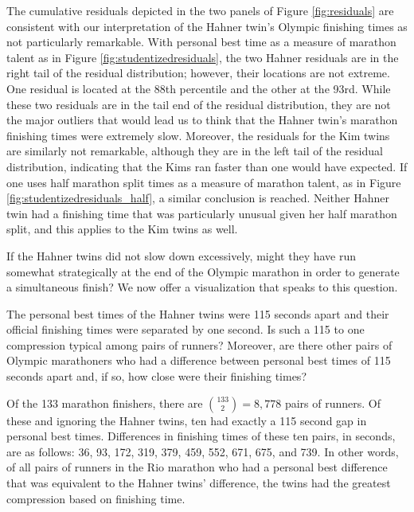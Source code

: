 \documentclass[12pt,titlepage]{article}
\begin{document}
The cumulative residuals depicted in the two panels of Figure
\ref{fig:residuals} are consistent with our interpretation of the
Hahner twin's Olympic finishing times as not particularly remarkable.
With personal best time as a measure of marathon talent as in Figure
\ref{fig:studentizedresiduals}, the two Hahner residuals are in the
right tail of the residual distribution; however, their locations are
not extreme.  One residual is located at the 88th percentile and the
other at the 93rd.  While these two residuals are in the tail end of
the residual distribution, they are not the major outliers that would
lead us to think that the Hahner twin's marathon finishing times were
extremely slow.  Moreover, the residuals for the Kim twins are
similarly not remarkable, although they are in the left tail of the
residual distribution, indicating that the Kims ran faster than one
would have expected.  If one uses half marathon split times as a
measure of marathon talent, as in Figure
\ref{fig:studentizedresiduals_half}, a similar conclusion is reached.
Neither Hahner twin had a finishing time that was particularly unusual
given her half marathon split, and this applies to the Kim twins as
well.

If the Hahner twins did not slow down excessively, might they have run
somewhat strategically at the end of the Olympic marathon in order to
generate a simultaneous finish?  We now offer a visualization that
speaks to this question.

The personal best times of the Hahner twins were 115 seconds apart and
their official finishing times were separated by one second.  Is such
a 115 to one compression typical among pairs of runners?  Moreover,
are there other pairs of Olympic marathoners who had a difference
between personal best times of 115 seconds apart and, if so, how close
were their finishing times?

Of the 133 marathon finishers, there are $\binom{133}{2} = 8,778$
pairs of runners.  Of these and ignoring the Hahner twins, ten had
exactly a 115 second gap in personal best times.  Differences in
finishing times of these ten pairs, in seconds, are as follows: 36,
93, 172, 319, 379, 459, 552, 671, 675, and 739.  In other words, of
all pairs of runners in the Rio marathon who had a personal best
difference that was equivalent to the Hahner twins' difference, the
twins had the greatest compression based on finishing time.
\end{document}
